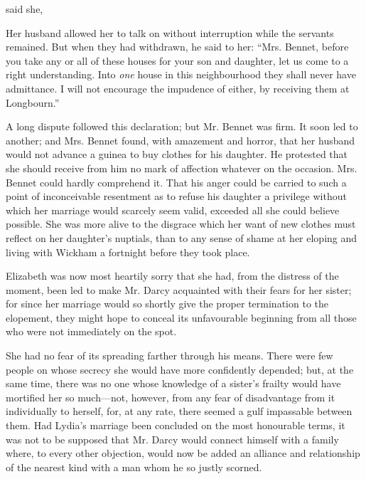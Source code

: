  said she, 

Her husband allowed her to talk on without interruption while the servants remained. But when they had withdrawn, he said to her: “Mrs. Bennet, before you take any or all of these houses for your son and daughter, let us come to a right understanding. Into {\em one} house in this neighbourhood they shall never have admittance. I will not encourage the impudence of either, by receiving them at Longbourn.”

A long dispute followed this declaration; but Mr. Bennet was firm. It soon led to another; and Mrs. Bennet found, with amazement and horror, that her husband would not advance a guinea to buy clothes for his daughter. He protested that she should receive from him no mark of affection whatever on the occasion. Mrs. Bennet could hardly comprehend it. That his anger could be carried to such a point of inconceivable resentment as to refuse his daughter a privilege without which her marriage would scarcely seem valid, exceeded all she could believe possible. She was more alive to the disgrace which her want of new clothes must reflect on her daughter's nuptials, than to any sense of shame at her eloping and living with Wickham a fortnight before they took place.

Elizabeth was now most heartily sorry that she had, from the distress of the moment, been led to make Mr. Darcy acquainted with their fears for her sister; for since her marriage would so shortly give the proper termination to the elopement, they might hope to conceal its unfavourable beginning from all those who were not immediately on the spot.

She had no fear of its spreading farther through his means. There were few people on whose secrecy she would have more confidently depended; but, at the same time, there was no one whose knowledge of a sister's frailty would have mortified her so much---not, however, from any fear of disadvantage from it individually to herself, for, at any rate, there seemed a gulf impassable between them. Had Lydia's marriage been concluded on the most honourable terms, it was not to be supposed that Mr. Darcy would connect himself with a family where, to every other objection, would now be added an alliance and relationship of the nearest kind with a man whom he so justly scorned.

